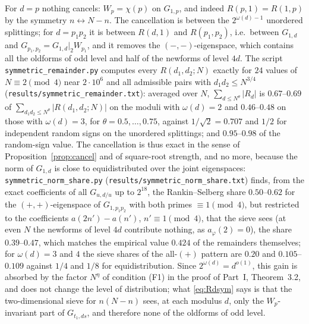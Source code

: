 ﻿\documentclass[11pt]{amsart}
\theoremstyle{remark}
\begin{document}
For $d=p$ nothing cancels: $W_p=\chi(p)$ on $G_{1,p}$, and indeed $R(p,1)=R(1,p)$ by the symmetry $n\leftrightarrow N-n$. The cancellation is between the $2^{\omega(d)-1}$ unordered splittings; for $d=p_1p_2$ it is between $R(d,1)$ and $R(p_1,p_2)$, i.e.\ between $G_{1,d}$ and $G_{p_1,p_2}=G_{1,d}|_2W_{p_1}$, and it removes the $(-,-)$-eigenspace, which contains all the oldforms of odd level and half of the newforms of level $4d$. The script \texttt{symmetric\_remainder.py} computes every $R(d_1,d_2;N)$ exactly for $24$ values of $N\equiv2\pmod4$ near $2\cdot10^6$ and all admissible pairs with $d_1d_2\le N^{3/4}$ (\texttt{results/symmetric\_remainder.txt}): averaged over $N$, $\sum_{d\le N^\theta}|R_d|$ is $0.67$--$0.69$ of $\sum_{d_1d_2\le N^\theta}|R(d_1,d_2;N)|$ on the moduli with $\omega(d)=2$ and $0.46$--$0.48$ on those with $\omega(d)=3$, for $\theta=0.5,\ldots,0.75$, against $1/\sqrt2=0.707$ and $1/2$ for independent random signs on the unordered splittings; and $0.95$--$0.98$ of the random-sign value. The cancellation is thus exact in the sense of Proposition~\ref{prop:cancel} and of square-root strength, and no more, because the norm of $G_{1,d}$ is close to equidistributed over the joint eigenspaces: \texttt{symmetric\_norm\_share.py} (\texttt{results/symmetric\_norm\_share.txt}) finds, from the exact coefficients of all $G_{u,d/u}$ up to $2^{18}$, the Rankin--Selberg share $0.50$--$0.62$ for the $(+,+)$-eigenspace of $G_{1,p_1p_2}$ with both primes $\equiv1\pmod4$, but restricted to the coefficients $a(2n')-a(n')$, $n'\equiv1\pmod4$, that the sieve sees (at even $N$ the newforms of level $4d$ contribute nothing, as $a_\varphi(2)=0$), the share $0.39$--$0.47$, which matches the empirical value $0.424$ of the remainders themselves; for $\omega(d)=3$ and $4$ the sieve shares of the all-$(+)$ pattern are $0.20$ and $0.105$--$0.109$ against $1/4$ and $1/8$ for equidistribution. Since $2^{\omega(d)}=d^{o(1)}$, this gain is absorbed by the factor $N^\eta$ of condition (F1) in the proof of Part~I, Theorem~3.2, and does not change the level of distribution; what \eqref{eq:Rdsym} says is that the two-dimensional sieve for $n(N-n)$ sees, at each modulus $d$, only the $W_p$-invariant part of $G_{t_1,ds}$, and therefore none of the oldforms of odd level.
\end{document}
